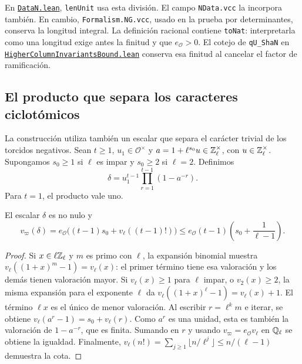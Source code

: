 En \href{https://github.com/CocoSgt/riemann-hypothesis-lean/blob/7cbf7a0c32fca1badf05931879a37c3f8a2b03b4/src/Formalism/SharpRestriction/LevelLetterCocycles/DataN.lean}{\nolinkurl{DataN.lean}}, \texttt{lenUnit} usa esta división.
El campo \texttt{NData.vcc} la incorpora también.
En cambio, \texttt{Formalism.NG.vcc}, usado en la prueba
por determinantes, conserva la longitud integral. La definición racional contiene
\texttt{toNat}: interpretarla como una longitud exige antes
la finitud y que $e_{\mathcal O}>0$.
El cotejo de \texttt{qU\_ShaN} en
\href{https://github.com/CocoSgt/riemann-hypothesis-lean/blob/7cbf7a0c32fca1badf05931879a37c3f8a2b03b4/src/Formalism/AdmissibleDesigns/HigherColumnInvariantsBound.lean}{\nolinkurl{HigherColumnInvariantsBound.lean}} conserva esa
finitud al cancelar el factor de ramificación.

\subsection{El producto que separa los caracteres ciclotómicos}

La construcción utiliza también un escalar que separa el
carácter trivial de los torcidos negativos.
Sean $t\ge1$, $u_1\in\mathcal O^\times$ y
$a=1+\ell^{s_0}u\in\mathbb{Z}_\ell^\times$, con $u\in\mathbb{Z}_\ell^\times$.
Supongamos $s_0\ge1$ si $\ell$ es impar y $s_0\ge2$ si
$\ell=2$. Definimos
\begin{equation}
 \delta=u_1^{t-1}\prod_{r=1}^{t-1}(1-a^{-r}).
 \label{eq:ti-delta}
\end{equation}
Para $t=1$, el producto vale uno.

\begin{lema}
\label{lem:ti-delta}
El escalar $\delta$ es no nulo y
\begin{equation}
 v_\varpi(\delta)
 =e_{\mathcal O}\bigl((t-1)s_0+v_\ell((t-1)!)\bigr)
 \le e_{\mathcal O}(t-1)\left(s_0+\frac1{\ell-1}\right).
 \label{eq:ti-delta-val}
\end{equation}
\end{lema}
\begin{proof}
Si $x\in\ell\mathbb{Z}_\ell$ y $m$ es primo con $\ell$, la expansión
binomial muestra $v_\ell((1+x)^m-1)=v_\ell(x)$:
el primer término tiene esa valoración y los demás tienen
valoración mayor. Si $v_\ell(x)\ge1$ para $\ell$ impar,
o $v_2(x)\ge2$, la misma expansión para el exponente $\ell$
da $v_\ell((1+x)^\ell-1)=v_\ell(x)+1$.
El término $\ell x$ es el único de menor valoración.
Al escribir $r=\ell^k m$ e iterar, se obtiene
$v_\ell(a^r-1)=s_0+v_\ell(r)$.
Como $a^r$ es una unidad, esta es también la valoración de
$1-a^{-r}$, que es finita. Sumando en $r$ y usando
$v_\varpi=e_{\mathcal O}v_\ell$ en $\mathbb{Q}_\ell$ se obtiene
la igualdad. Finalmente,
$v_\ell(n!)=\sum_{j\ge1}\lfloor n/\ell^j\rfloor
\le n/(\ell-1)$ demuestra la cota.
\end{proof}

